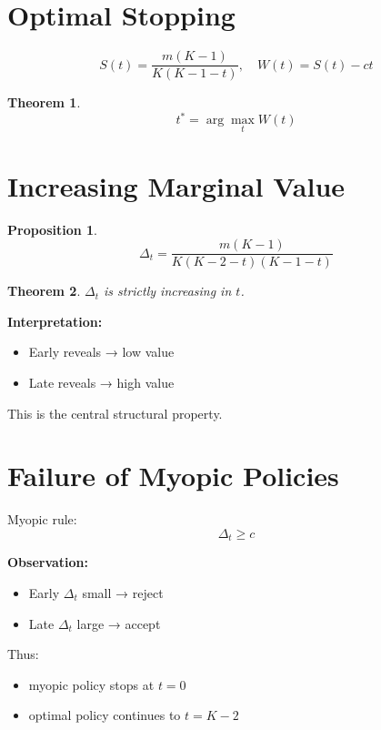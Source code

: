 \documentclass[11pt]{article}
\newtheorem{theorem}{Theorem}
\newtheorem{proposition}{Proposition}
\begin{document}
\section{Optimal Stopping}

\[
S(t) = \frac{m(K-1)}{K(K-1-t)}, \quad W(t) = S(t) - ct
\]

\begin{theorem}
\[
t^* = \arg\max_t W(t)
\]
\end{theorem}

\section{Increasing Marginal Value}

\begin{proposition}
\[
\Delta_t = \frac{m(K-1)}{K(K-2-t)(K-1-t)}
\]
\end{proposition}

\begin{theorem}
$\Delta_t$ is strictly increasing in $t$.
\end{theorem}

\textbf{Interpretation:}
\begin{itemize}
\item Early reveals → low value
\item Late reveals → high value
\end{itemize}

This is the central structural property.

\section{Failure of Myopic Policies}

Myopic rule:
\[
\Delta_t \ge c
\]

\textbf{Observation:}
\begin{itemize}
\item Early $\Delta_t$ small → reject
\item Late $\Delta_t$ large → accept
\end{itemize}

Thus:
\begin{itemize}
\item myopic policy stops at $t=0$
\item optimal policy continues to $t=K-2$
\end{itemize}

\end{document}
